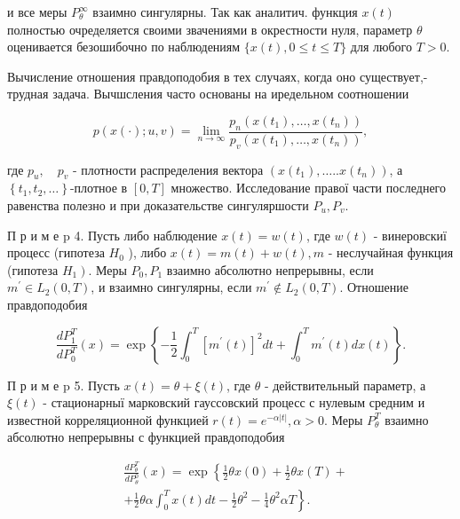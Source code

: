 \documentclass[10pt]{article}
\begin{document}
и все меры $P_{\theta}^{\infty}$ взаимно сингулярны. Так как аналитич. функция $x(t)$ полностью очределяется своими звачениями в окрестности нуля, параметр $\theta$ оценивается безошибочно по наблюдениям $\{x(t), 0 \leqslant t \leqslant T\}$ для любого $T>0$.



Вычисление отношения правдоподобия в тех случаях, когда оно существует,- трудная задача. Вычшсления часто основаны на иредельном соотношении



\[

p(x(\cdot) ; u, v)=\lim _{n \rightarrow \infty} \frac{p_{n}\left(x\left(t_{1}\right), \ldots, x\left(t_{n}\right)\right)}{p_{v}\left(x\left(t_{1}\right), \ldots, x\left(t_{n}\right)\right)},

\]



где $p_{u}, \quad p_{v}$ - плотности распределения вектора $\left(x\left(t_{1}\right), \ldots . . x\left(t_{n}\right)\right)$, а $\left\{t_{1}, t_{2}, \ldots\right\}$-плотное в $[0, T]$ множество. Исследование правої части последнего равенства полезно и при доказательстве сингуляршости $P_{u}, P_{v}$.



П р и м е $\mathrm{p}$ 4. Пусть либо наблюдение $x(t)=w(t)$, где $w(t)$ - винеровскиї процесс (гипотеза $H_{0}$ ), либо $x(t)=m(t)+w(t), m$ - неслучайная функция (гипотеза $\left.H_{1}\right)$. Меры $P_{0}, P_{1}$ взаимно абсолютно непрерывны, если $m^{\prime} \in L_{2}(0, T)$, и взаимно сингулярны, если $m^{\prime} \notin L_{2}(0, T)$. Отношение правдоподобия



\[

\frac{d P_{1}^{T}}{d P_{0}^{T}}(x)=\exp \left\{-\frac{1}{2} \int_{0}^{T}\left[m^{\prime}(t)\right]^{2} d t+\int_{0}^{T} m^{\prime}(t) d x(t)\right\} .

\]



П р и м е p 5. Пусть $x(t)=\theta+\xi(t)$, где $\theta$ - действительный параметр, а $\xi(t)$ - стационарныї марковский гауссовский процесс с нулевым средним и известной корреляционной функцией $r(t)=e^{-\alpha|t|}, \alpha>0$. Меры $P_{\theta}^{T}$ взаимно абсолютно непрерывны с функцией правдоподобия



\[

\begin{aligned}

& \frac{d P_{\theta}^{T}}{d P_{\theta}^{0}}(x)=\exp \left\{\frac{1}{2} \theta x(0)+\frac{1}{2} \theta x(T)+\right. \\

& \left.+\frac{1}{2} \theta \alpha \int_{0}^{T} x(t) d t-\frac{1}{2} \theta^{2}-\frac{1}{4} \theta^{2} \alpha T\right\} .

\end{aligned}

\]
\end{document}
